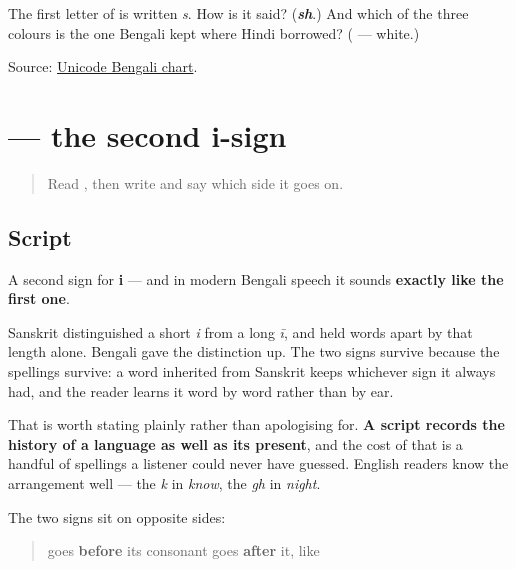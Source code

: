 \begin{tcolorbox}[breakable,colback=teal!4,colframe=teal!35!black,title={Before you move on}]
The first letter of \textbf{} is written \emph{s}. How is it said? (\emph{\textbf{sh}}.) And which of the three colours is the one Bengali kept where Hindi borrowed? (\textbf{} — white.)

Source: \href{https://www.unicode.org/charts/PDF/U0980.pdf}{Unicode Bengali chart}.
\end{tcolorbox}
\section[\texorpdfstring{\bn{ী} (-i (long))}{ী (-i (long))}]{ — the second i-sign}

\label{lesson:BN-W04-ii-matra}



\begin{quote}
Read \textbf{}, then write \textbf{} and say which side it goes on.
\end{quote}

\subsection*{Script}
\begin{quote}
\end{quote}

A second sign for \textbf{i} — and in modern Bengali speech it sounds \textbf{exactly like the first one}.

Sanskrit distinguished a short \emph{i} from a long \emph{ī}, and held words apart by that length alone. Bengali gave the distinction up. The two signs survive because the spellings survive: a word inherited from Sanskrit keeps whichever sign it always had, and the reader learns it word by word rather than by ear.

That is worth stating plainly rather than apologising for. \textbf{A script records the history of a language as well as its present}, and the cost of that is a handful of spellings a listener could never have guessed. English readers know the arrangement well — the \emph{k} in \emph{know}, the \emph{gh} in \emph{night}.

The two signs sit on opposite sides:

\begin{quote}
\textbf{} goes \textbf{before} its consonant \textbf{} goes \textbf{after} it, like \textbf{}
\end{quote}

